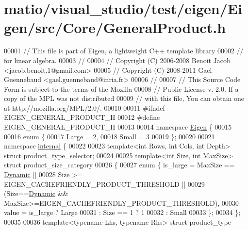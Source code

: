 \hypertarget{matio_2visual__studio_2test_2eigen_2_eigen_2src_2_core_2_general_product_8h_source}{}\section{matio/visual\+\_\+studio/test/eigen/\+Eigen/src/\+Core/\+General\+Product.h}
\label{matio_2visual__studio_2test_2eigen_2_eigen_2src_2_core_2_general_product_8h_source}

\begin{DoxyCode}
00001 \textcolor{comment}{// This file is part of Eigen, a lightweight C++ template library}
00002 \textcolor{comment}{// for linear algebra.}
00003 \textcolor{comment}{//}
00004 \textcolor{comment}{// Copyright (C) 2006-2008 Benoit Jacob <jacob.benoit.1@gmail.com>}
00005 \textcolor{comment}{// Copyright (C) 2008-2011 Gael Guennebaud <gael.guennebaud@inria.fr>}
00006 \textcolor{comment}{//}
00007 \textcolor{comment}{// This Source Code Form is subject to the terms of the Mozilla}
00008 \textcolor{comment}{// Public License v. 2.0. If a copy of the MPL was not distributed}
00009 \textcolor{comment}{// with this file, You can obtain one at http://mozilla.org/MPL/2.0/.}
00010 
00011 \textcolor{preprocessor}{#ifndef EIGEN\_GENERAL\_PRODUCT\_H}
00012 \textcolor{preprocessor}{#define EIGEN\_GENERAL\_PRODUCT\_H}
00013 
00014 \textcolor{keyword}{namespace }\hyperlink{namespace_eigen}{Eigen} \{
00015 
00016 \textcolor{keyword}{enum} \{
00017   Large = 2,
00018   Small = 3
00019 \};
00020 
00021 \textcolor{keyword}{namespace }\hyperlink{namespaceinternal}{internal} \{
00022 
00023 \textcolor{keyword}{template}<\textcolor{keywordtype}{int} Rows, \textcolor{keywordtype}{int} Cols, \textcolor{keywordtype}{int} Depth> \textcolor{keyword}{struct }product\_type\_selector;
00024 
00025 \textcolor{keyword}{template}<\textcolor{keywordtype}{int} Size, \textcolor{keywordtype}{int} MaxSize> \textcolor{keyword}{struct }product\_size\_category
00026 \{
00027   \textcolor{keyword}{enum} \{ is\_large = MaxSize == \hyperlink{namespace_eigen_ad81fa7195215a0ce30017dfac309f0b2}{Dynamic} ||
00028                     Size >= EIGEN\_CACHEFRIENDLY\_PRODUCT\_THRESHOLD ||
00029                     (Size==\hyperlink{namespace_eigen_ad81fa7195215a0ce30017dfac309f0b2}{Dynamic} && MaxSize>=EIGEN\_CACHEFRIENDLY\_PRODUCT\_THRESHOLD),
00030          value = is\_large  ? Large
00031                : Size == 1 ? 1
00032                            : Small
00033   \};
00034 \};
00035 
00036 \textcolor{keyword}{template}<\textcolor{keyword}{typename} Lhs, \textcolor{keyword}{typename} Rhs> \textcolor{keyword}{struct }product\_type

\end{DoxyCode}
